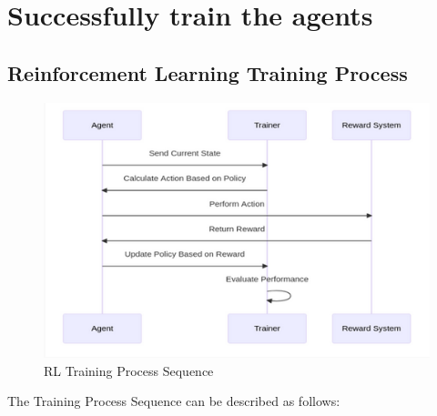 \section{Successfully train the agents}


\subsection{Reinforcement Learning Training Process}

\begin{figure}[H]
    \centering
    \includegraphics[height=0.25\textheight]{images/train.png} 
    \caption{RL Training Process Sequence}
\end{figure}

The Training Process Sequence can be described as follows:

